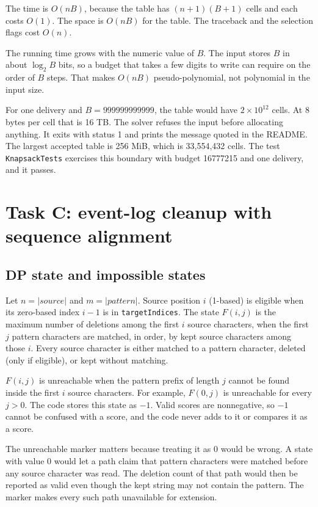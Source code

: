 \documentclass[11pt]{article}
\begin{document}
The time is $O(nB)$, because the table has $(n+1)(B+1)$ cells and each costs $O(1)$. The space is
$O(nB)$ for the table. The traceback and the selection flags cost $O(n)$.

The running time grows with the numeric value of $B$. The input stores $B$ in about $\log_2 B$
bits, so a budget that takes a few digits to write can require on the order of $B$ steps. That
makes $O(nB)$ pseudo-polynomial, not polynomial in the input size.

For one delivery and $B = 999999999999$, the table would have $2 \times 10^{12}$ cells. At 8 bytes
per cell that is 16 TB. The solver refuses the input before allocating anything. It exits with
status 1 and prints the message quoted in the README. The largest accepted table is 256 MiB,
which is 33,554,432 cells. The test \texttt{KnapsackTests} exercises this boundary with budget
16777215 and one delivery, and it passes.

\section{Task C: event-log cleanup with sequence alignment}

\subsection{DP state and impossible states}

Let $n = |source|$ and $m = |pattern|$. Source position $i$ (1-based) is eligible when its
zero-based index $i-1$ is in \texttt{targetIndices}. The state $F(i,j)$ is the maximum number of
deletions among the first $i$ source characters, when the first $j$ pattern characters are matched,
in order, by kept source characters among those $i$. Every source character is either matched to a
pattern character, deleted (only if eligible), or kept without matching.

$F(i,j)$ is unreachable when the pattern prefix of length $j$ cannot be found inside the first $i$
source characters. For example, $F(0,j)$ is unreachable for every $j > 0$. The code stores this
state as $-1$. Valid scores are nonnegative, so $-1$ cannot be confused with a score, and the code
never adds to it or compares it as a score.

The unreachable marker matters because treating it as $0$ would be wrong. A state with value 0 would
let a path claim that pattern characters were matched before any source character was read. The
deletion count of that path would then be reported as valid even though the kept string may not
contain the pattern. The marker makes every such path unavailable for extension.
\end{document}
